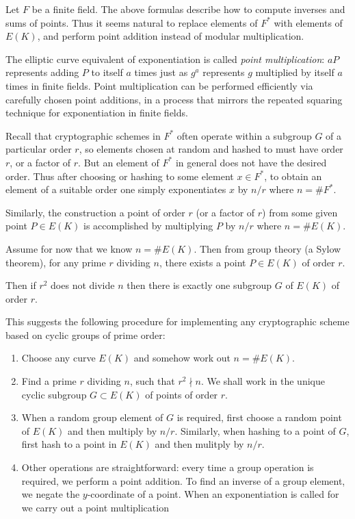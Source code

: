 Let $F$ be a finite field.
The above formulas describe how to compute inverses and sums of
points. Thus it seems natural to replace elements of $F^*$
with elements of $E(K)$, and perform
point addition instead of modular multiplication.

The elliptic curve
equivalent of exponentiation is called
\emph{point multiplication}: $a P$ represents
adding $P$ to itself $a$ times just as $g^a$ represents $g$ multiplied
by itself $a$ times in finite fields.
Point multiplication can be performed efficiently via carefully
chosen point
additions, in a process that mirrors the repeated squaring technique
for exponentiation in finite fields.

Recall that cryptographic schemes in $F^*$ often operate
within a subgroup $G$ of a particular order $r$,
so elements chosen at random and hashed to must have
order $r$, or a factor of $r$. But an element of $F^*$
in general does not have the desired order.
Thus after choosing or hashing to some element $x \in F^*$,
to obtain an element of a suitable order one simply exponentiates $x$
by $n / r$ where $n = \#F^*$.

Similarly, the construction a point of order $r$ (or a factor of $r$)
from some given point $P \in E(K)$ is accomplished by multiplying $P$ by
$n / r$ where $n = \#E(K)$.

Assume for now that we know $n = \#E(K)$. Then from group theory (a
Sylow theorem), for any prime $r$ dividing $n$,
there exists a point $P \in E(K)$ of order $r$.

Then if $r^2$ does not divide $n$ then there is exactly one
subgroup $G$ of $E(K)$ of order $r$.

This suggests the following procedure for implementing any cryptographic
scheme based on cyclic groups of prime order:

\begin{enumerate}
\item
Choose any curve $E(K)$ and somehow work out $n = \#E(K)$.
\item
Find a prime $r$ dividing $n$, such that $r^2 \nmid n$.
We shall work in the unique cyclic subgroup $G \subset E(K)$ of points
of order $r$.
\item
When a random group element of $G$ is required, first choose a random point
of $E(K)$ and then multiply by $n / r$. Similarly, when hashing to
a point of $G$, first hash to a point in $E(K)$ and then mulitply by
$n / r$.
\item
Other operations are straightforward: every time a group
operation is required, we perform a point addition. To find an inverse
of a group element, we negate the $y$-coordinate of a point. When
an exponentiation is called for we carry out a point multiplication
\end{enumerate}

